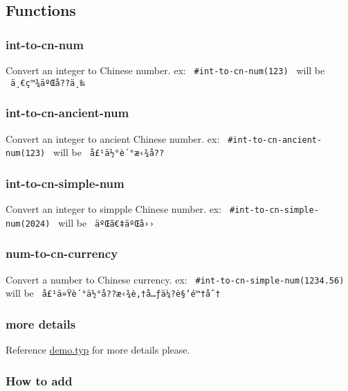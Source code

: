 \subsection{Functions}\label{functions}

\subsubsection{int-to-cn-num}\label{int-to-cn-num}

Convert an integer to Chinese number. ex:
\texttt{\ \#int-to-cn-num(123)\ } will be \texttt{\ ä¸€ç™¾äºŒå??ä¸‰\ }

\subsubsection{int-to-cn-ancient-num}\label{int-to-cn-ancient-num}

Convert an integer to ancient Chinese number. ex:
\texttt{\ \#int-to-cn-ancient-num(123)\ } will be
\texttt{\ å£¹ä½°è´°æ‹¾å??\ }

\subsubsection{int-to-cn-simple-num}\label{int-to-cn-simple-num}

Convert an integer to simpple Chinese number. ex:
\texttt{\ \#int-to-cn-simple-num(2024)\ } will be
\texttt{\ äºŒã€‡äºŒå››\ }

\subsubsection{num-to-cn-currency}\label{num-to-cn-currency}

Convert a number to Chinese currency. ex:
\texttt{\ \#int-to-cn-simple-num(1234.56)\ } will be
\texttt{\ å£¹ä»Ÿè´°ä½°å??æ‹¾è‚†å…ƒä¼?è§’é™†åˆ†\ }

\subsubsection{more details}\label{more-details}

Reference
\href{https://github.com/typst/packages/raw/main/packages/preview/a2c-nums/0.0.1/demo.typ}{demo.typ}
for more details please.

\subsubsection{How to add}\label{how-to-add}

